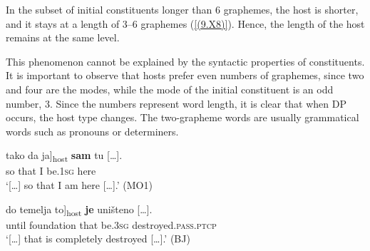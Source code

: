
In the subset of initial constituents longer than 6 graphemes, the host is shorter, and it stays at a length of 3--6 graphemes (\ref{(9.X8)}). Hence, the length of the host remains at the same level. 


\noindent This phenomenon cannot be explained by the syntactic properties of constituents. It is important to observe that hosts prefer even numbers of graphemes, since two and four are the modes, while the mode of the initial constituent is an odd number, 3. Since the numbers represent word length, it is clear that when DP occurs, the host type changes. The two-grapheme words are usually grammatical words such as pronouns or determiners.

\begin{exe}\ex\label{(9.X9)}
\gll  [\dots] tako da \minsp{[} ja]\textsubscript{host} \textbf{sam} {tu  [\dots].} \\
{} so that {} I be.1\textsc{sg} here \\
\glt ‘[\dots] so that I am here  [\dots].’ 
\hfill (MO1)

\ex\label{(9.X10)}
\gll  [\dots] do temelja \minsp{[} to]\textsubscript{host} \textbf{je} {uništeno  [\dots].} \\
{} until foundation {} that be.3\textsc{sg} destroyed.\textsc{pass}.\textsc{ptcp} \\
\glt ‘[\dots] that is completely destroyed  [\dots].’ 
\hfill (BJ)
\end{exe}

